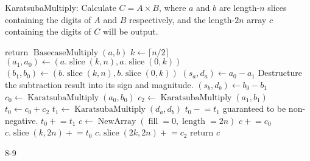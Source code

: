\documentclass{computer-arithmetic}
\begin{document}
\begin{algorithm}
  \caption{KaratsubaMultiply: Calculate \(C = A × B\), where \(a\) and
    \(b\) are length-\(n\) slices containing the digits of \(A\) and
    \(B\) respectively, and the length-\(2n\) array \(c\) containing
    the digits of \(C\) will be output.}
\begin{algorithmic}[1]
    \State return $\operatorname{BasecaseMultiply}(a, b)$
\EndIf
\State $k ← \lceil n / 2 \rceil$
\State \((a_1, a_0) ← (a.\operatorname{slice}(k, n), a.\operatorname{slice}(0, k))\)
\State \((b_1, b_0) ← (b.\operatorname{slice}(k, n), b.\operatorname{slice}(0, k))\)
\State \((s_a, d_a) ← a_0 - a_1\)
\Comment Destructure the subtraction result into its sign and magnitude.
\State \((s_b, d_b) ← b_0 - b_1\)
\State \(c_0 ← \operatorname{KaratsubaMultiply}(a_0, b_0)\)
\State \(c_2 ← \operatorname{KaratsubaMultiply}(a_1, b_1)\)
\State \(t_0 ← c_0 + c_2\)
\State \(t_1 ← \operatorname{KaratsubaMultiply}(d_a, d_b)\)
\State \(t_0 \mathrel{-}= t_1\)
\Comment guaranteed to be non-negative.
\Else
\State \(t_0 \mathrel{+}= t_1\)
\EndIf
\State \(c ← \operatorname{NewArray}(\operatorname{fill}=0, \operatorname{length}=2n)\)
\State \(c \mathrel{+}= c_0\)
\State \(c.\operatorname{slice}(k, 2n) \mathrel{+}= t_0\)
\State \(c.\operatorname{slice}(2k, 2n) \mathrel{+}= c_2\)
\State return \(c\)
\end{algorithmic}
\end{algorithm}

\begin{problem}{8-9}
\end{problem}

\begin{solution}
\end{solution}
\end{document}
